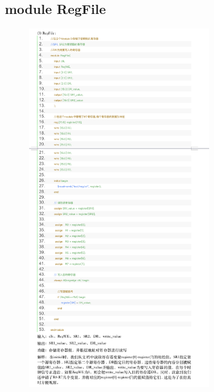 \documentclass{article}
\begin{document}
\subsection{module RegFile}
\begin{figure}[H]
    \centering
    \includegraphics[width=0.7\textwidth]{pic/12.png}
  
    \end{figure}
\end{document}
